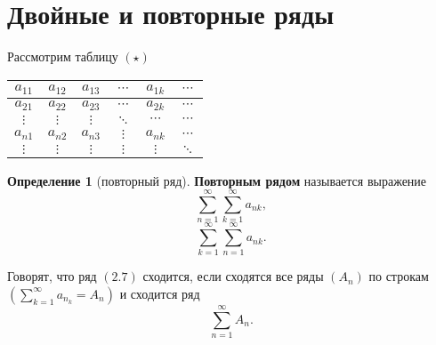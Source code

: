 \documentclass{report}
\theoremstyle{definition}
\newtheorem{definition}{Определение}[section]
\begin{document}
\section{Двойные и повторные ряды}

Рассмотрим таблицу $(\star)$
\begin{center}
  \begin{tabular}{c | c | c | c | c | c}
    $a_{11}$ & $a_{12}$ & $a_{13}$ & $\cdots$ & $a_{1k}$ & $\cdots$ \\
    \hline
    $a_{21}$ & $a_{22}$ & $a_{23}$ & $\cdots$ & $a_{2k}$ & $\cdots$ \\
    \hline
    $\vdots$ & $\vdots$ & $\vdots$ & $\ddots$ & $\cdots$ & $\cdots$ \\
    \hline
    $a_{n1}$ & $a_{n2}$ & $a_{n3}$ & $\vdots$ & $a_{nk}$ & $\cdots$ \\
    \hline
    $\vdots$ & $\vdots$ & $\vdots$ & $\vdots$ & $\vdots$ & $\ddots$ \\
  \end{tabular}
\end{center}

\begin{definition}[повторный ряд]
  \textbf{Повторным рядом} называется выражение
  \begin{equation}
    \sum_{n=1}^{\infty}\sum_{k=1}^{\infty}a_{nk},
  \end{equation}
  \begin{equation}
    \sum_{k=1}^{\infty}\sum_{n=1}^{\infty}a_{nk}.
  \end{equation}

  Говорят, что ряд $(2.7)$ сходится, если сходятся все ряды $(A_n)$ по строкам $(\sum_{k=1}^{\infty}a_{n_k} = A_n)$ и сходится ряд
  \begin{equation*}
    \sum_{n=1}^{\infty}A_n.
  \end{equation*}
\end{definition}
\end{document}
